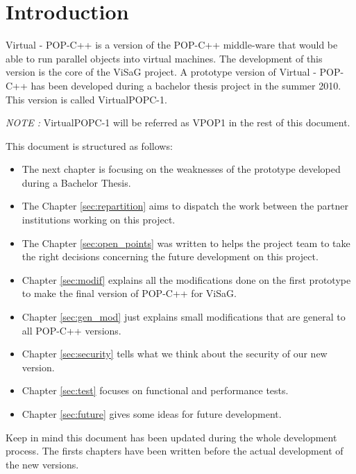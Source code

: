 \documentclass[a4paper, 11pt]{article}
\newcommand{\s}{\vspace{0.3cm}}
\begin{document}




\tableofcontents
\pagebreak
\section{Introduction}
Virtual - POP-C++ is a version of the POP-C++ middle-ware that would be able to run parallel objects into virtual machines. The development of this version is the core of the ViSaG project. A prototype version of Virtual - POP-C++ has been developed during a bachelor thesis project in the summer 2010. This version is called VirtualPOPC-1\cite{vpopc1}.\s

\textit{NOTE : } VirtualPOPC-1 will be referred as VPOP1 in the rest of this document.\s

This document is structured as follows:
\begin{itemize}
\item The next chapter is focusing on the weaknesses of the prototype developed during a Bachelor Thesis. 
\item The Chapter \ref{sec:repartition} aims to dispatch the work between the partner institutions working on this project. 
\item The Chapter \ref{sec:open_points} was written to helps the project team to take the right decisions concerning the future development on this project. 
\item Chapter \ref{sec:modif} explains all the modifications done on the first prototype to make the final version of POP-C++ for ViSaG.
\item Chapter \ref{sec:gen_mod} just explains small modifications that are general to all POP-C++ versions.
\item Chapter \ref{sec:security} tells what we think about the security of our new version.
\item Chapter \ref{sec:test} focuses on functional and performance tests. 
\item Chapter \ref{sec:future} gives some ideas for future development. 

\end{itemize}

Keep in mind this document has been updated during the whole development process. The firsts chapters have been written before the actual development of the new versions. 




\end{document}
